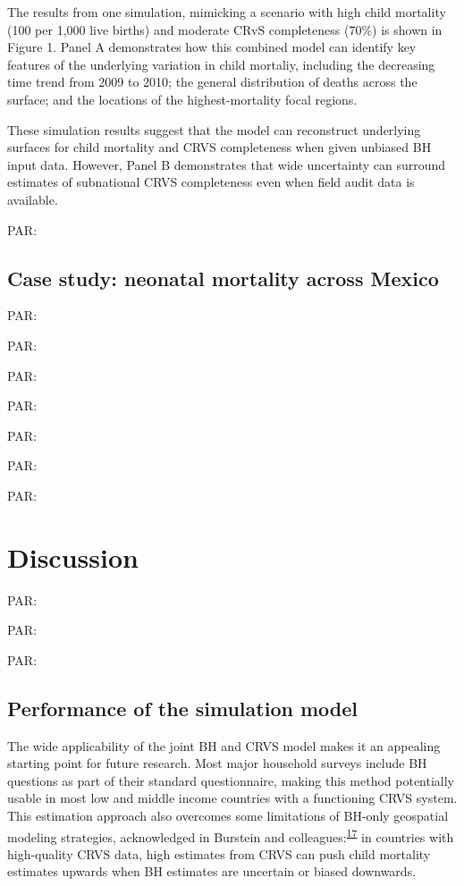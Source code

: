 \documentclass[
]{article}
\begin{document}
The results from one simulation, mimicking a scenario with high child mortality (100 per 1,000 live births) and moderate CRvS completeness (70\%) is shown in Figure 1. Panel A demonstrates how this combined model can identify key features of the underlying variation in child mortaliy, including the decreasing time trend from 2009 to 2010; the general distribution of deaths across the surface; and the locations of the highest-mortality focal regions.

These simulation results suggest that the model can reconstruct underlying surfaces for child mortality and CRVS completeness when given unbiased BH input data. However, Panel B demonstrates that wide uncertainty can surround estimates of subnational CRVS completeness even when field audit data is available.

PAR:

\hypertarget{case-study-neonatal-mortality-across-mexico}{%
\subsection{Case study: neonatal mortality across Mexico}\label{case-study-neonatal-mortality-across-mexico}}

PAR:

PAR:

PAR:

PAR:

PAR:

PAR:

PAR:

\hypertarget{discussion}{%
\section{Discussion}\label{discussion}}

PAR:

PAR:

PAR:

\hypertarget{performance-of-the-simulation-model}{%
\subsection{Performance of the simulation model}\label{performance-of-the-simulation-model}}

The wide applicability of the joint BH and CRVS model makes it an appealing starting point for future research. Most major household surveys include BH questions as part of their standard questionnaire, making this method potentially usable in most low and middle income countries with a functioning CRVS system. This estimation approach also overcomes some limitations of BH-only geospatial modeling strategies, acknowledged in Burstein and colleagues:\textsuperscript{\protect\hyperlink{ref-Burstein2019}{17}} in countries with high-quality CRVS data, high estimates from CRVS can push child mortality estimates upwards when BH estimates are uncertain or biased downwards.
\end{document}
